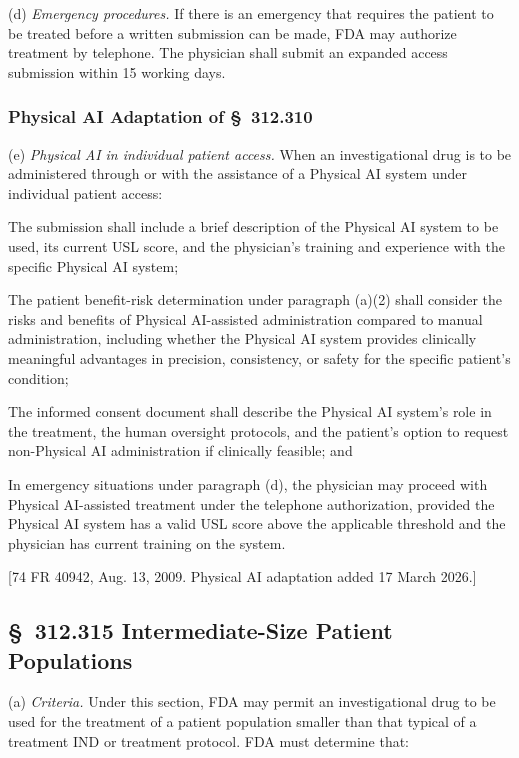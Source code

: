 (d) \textit{Emergency procedures.} If there is an emergency that requires the patient to be treated before a written submission can be made, FDA may authorize treatment by telephone. The physician shall submit an expanded access submission within 15 working days.

\subsubsection{Physical AI Adaptation of \S~312.310}

(e) \textit{Physical AI in individual patient access.} When an investigational drug is to be administered through or with the assistance of a Physical AI system under individual patient access:

\begin{description}[leftmargin=0.8cm,style=sameline]
\item[(i)] The submission shall include a brief description of the Physical AI system to be used, its current USL score, and the physician's training and experience with the specific Physical AI system;
\item[(ii)] The patient benefit-risk determination under paragraph (a)(2) shall consider the risks and benefits of Physical AI-assisted administration compared to manual administration, including whether the Physical AI system provides clinically meaningful advantages in precision, consistency, or safety for the specific patient's condition;
\item[(iii)] The informed consent document shall describe the Physical AI system's role in the treatment, the human oversight protocols, and the patient's option to request non-Physical AI administration if clinically feasible; and
\item[(iv)] In emergency situations under paragraph (d), the physician may proceed with Physical AI-assisted treatment under the telephone authorization, provided the Physical AI system has a valid USL score above the applicable threshold and the physician has current training on the system.
\end{description}

[74 FR 40942, Aug. 13, 2009. Physical AI adaptation added 17 March 2026.]

\subsection{\S~312.315 Intermediate-Size Patient Populations}

(a) \textit{Criteria.} Under this section, FDA may permit an investigational drug to be used for the treatment of a patient population smaller than that typical of a treatment IND or treatment protocol. FDA must determine that:

